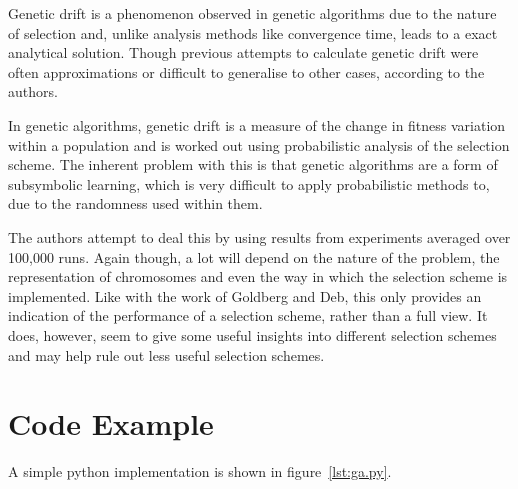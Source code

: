 \documentclass[10pt, a4paper]{article}
\begin{document}
Genetic drift is a phenomenon observed in genetic algorithms due to the nature
of selection and, unlike analysis methods like convergence time, leads to a
exact analytical solution. Though previous attempts to calculate genetic drift
were often approximations or difficult to generalise to other cases, according
to the authors.

In genetic algorithms, genetic drift is a measure of the change in fitness
variation within a population and is worked out using probabilistic analysis of
the selection scheme. The inherent problem with this is that genetic algorithms
are a form of subsymbolic learning, which is very difficult to apply 
probabilistic methods to, due to the randomness used within them.

The authors attempt to deal this by using results from experiments averaged 
over 100,000 runs. Again though, a lot will depend on the nature of the 
problem, the representation of chromosomes and even the way in which the
selection scheme is implemented. Like with the work of Goldberg and Deb, this 
only provides an indication of the performance of a selection scheme, rather
than a full view. It does, however, seem to give some useful insights into 
different selection schemes and may help rule out less useful selection 
schemes.




\newpage
\section{Code Example}
A simple python implementation is shown in figure~\ref{lst:ga.py}.





\newpage


\end{document}

